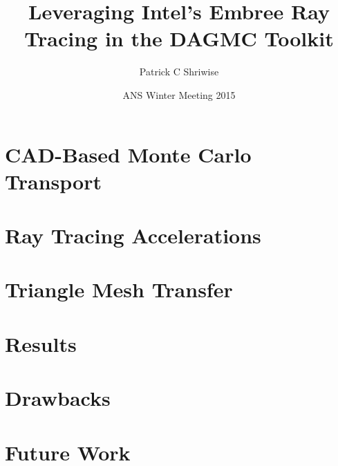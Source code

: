 \documentclass[12pt]{beamer}
\title{Leveraging Intel's Embree Ray Tracing in the DAGMC Toolkit}
\author{Patrick C Shriwise}
\institute{University of Wisconsin - Madison}
\date{ANS Winter Meeting 2015}
\begin{document}
\frame{\titlepage \addtocounter{framenumber}{-1}}


\begin{frame}
\frametitle{\null}
\tableofcontents
\end{frame}

\section{CAD-Based Monte Carlo Transport} %
\section{Ray Tracing Accelerations} %
\section{Triangle Mesh Transfer} %
\section{Results} %
\section{Drawbacks} %
\section{Future Work} %

\begin{frame}

\end{frame}

\end{document}
